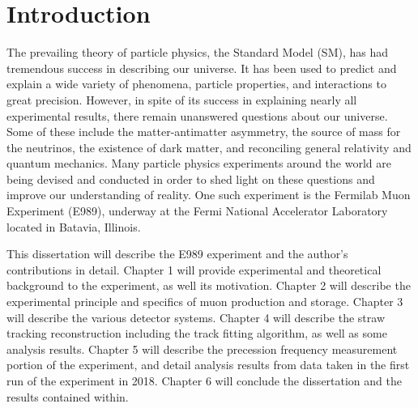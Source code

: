 
\thispagestyle{myheadings}
\graphicspath{{Body/Figures/Theory/}}

\chapter{Introduction}
\label{chapter:Introduction}

The prevailing theory of particle physics, the Standard Model (SM), has had tremendous success in describing our universe. It has been used to predict and explain a wide variety of phenomena, particle properties, and interactions to great precision. However, in spite of its success in explaining nearly all experimental results, there remain unanswered questions about our universe. Some of these include the matter-antimatter asymmetry, the source of mass for the neutrinos, the existence of dark matter, and reconciling general relativity and quantum mechanics. Many particle physics experiments around the world are being devised and conducted in order to shed light on these questions and improve our understanding of reality. One such experiment is the Fermilab Muon \gmtwo Experiment (E989), underway at the Fermi National Accelerator Laboratory located in Batavia, Illinois.


This dissertation will describe the E989 experiment and the author's contributions in detail. Chapter 1 will provide experimental and theoretical background to the experiment, as well its motivation. Chapter 2 will describe the experimental principle and specifics of muon production and storage. Chapter 3 will describe the various detector systems. Chapter 4 will describe the straw tracking reconstruction including the track fitting algorithm, as well as some analysis results. Chapter 5 will describe the precession frequency measurement portion of the experiment, and detail analysis results from data taken in the first run of the experiment in 2018. Chapter 6 will conclude the dissertation and the results contained within.



